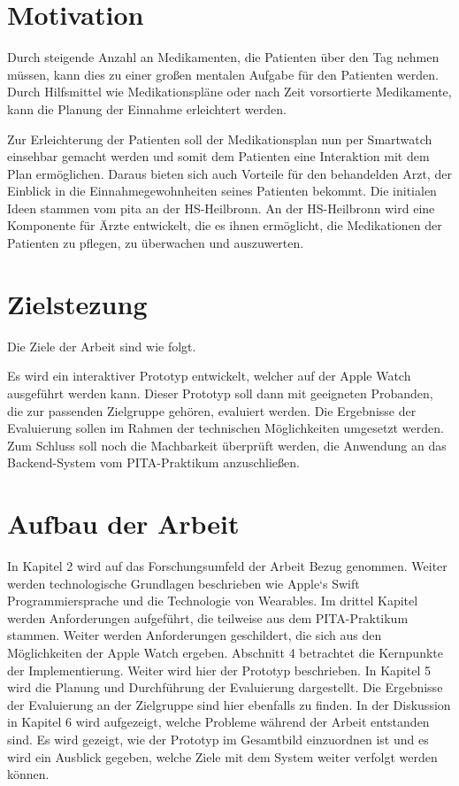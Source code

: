 \section{Motivation}
Durch steigende Anzahl an Medikamenten, die Patienten über den Tag nehmen müssen, kann dies zu einer großen mentalen Aufgabe für den Patienten werden. Durch Hilfsmittel wie Medikationspläne oder nach Zeit vorsortierte Medikamente, kann die Planung der Einnahme erleichtert werden. 

Zur Erleichterung der Patienten soll der Medikationsplan nun per Smartwatch einsehbar gemacht werden und somit dem Patienten eine Interaktion mit dem Plan ermöglichen. Daraus bieten sich auch Vorteile für den behandelden Arzt, der Einblick in die Einnahmegewohnheiten seines Patienten bekommt. Die initialen Ideen stammen vom \gls{pita} an der HS-Heilbronn. An der HS-Heilbronn wird eine Komponente für Ärzte entwickelt, die es ihnen ermöglicht, die Medikationen der Patienten zu pflegen, zu überwachen und auszuwerten.
\section{Zielstezung}
Die Ziele der Arbeit sind wie folgt.

Es wird ein interaktiver Prototyp entwickelt, welcher auf der Apple Watch ausgeführt werden kann. Dieser Prototyp soll dann mit geeigneten Probanden, die zur passenden Zielgruppe gehören, evaluiert werden.
Die Ergebnisse der Evaluierung sollen im Rahmen der technischen Möglichkeiten umgesetzt werden. Zum Schluss soll noch die Machbarkeit überprüft werden, die Anwendung an das Backend-System vom PITA-Praktikum anzuschließen.

\section{Aufbau der Arbeit}

In Kapitel 2 wird auf das Forschungsumfeld der Arbeit Bezug genommen. Weiter werden technologische Grundlagen beschrieben wie Apple`s Swift Programmiersprache und die Technologie von Wearables.
Im drittel Kapitel werden Anforderungen aufgeführt, die teilweise aus dem  PITA-Praktikum stammen. Weiter werden Anforderungen geschildert, die sich aus den Möglichkeiten der Apple Watch ergeben.
Abschnitt 4 betrachtet die Kernpunkte der Implementierung. Weiter wird hier der Prototyp beschrieben.
In Kapitel 5 wird die Planung und Durchführung der Evaluierung dargestellt. Die  Ergebnisse der Evaluierung an der Zielgruppe sind hier ebenfalls zu finden.
In der Diskussion in Kapitel 6 wird aufgezeigt, welche Probleme während der Arbeit entstanden sind. Es wird gezeigt, wie der Prototyp im Gesamtbild einzuordnen ist und es wird ein Ausblick gegeben, welche Ziele mit dem System weiter verfolgt werden können.

